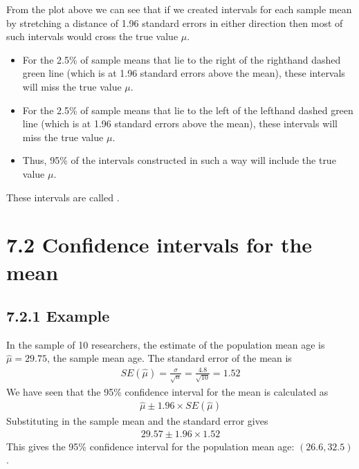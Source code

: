 \documentclass[letterpaper,10pt,english]{jupyterBook}
\begin{document}
\sphinxAtStartPar
From the plot above we can see that if we created intervals for each sample mean by stretching a distance of 1.96 standard errors in either direction then most of such intervals would cross the true value \(\mu\).
\begin{itemize}
\item {} 
\sphinxAtStartPar
For the 2.5\% of sample means that lie to the right of the right\sphinxhyphen{}hand dashed green line (which is at 1.96 standard errors above the mean), these intervals will miss the true value \(\mu\).

\item {} 
\sphinxAtStartPar
For the 2.5\% of sample means that lie to the left of the left\sphinxhyphen{}hand dashed green line (which is at 1.96 standard errors above the mean), these intervals will miss the true value \(\mu\).

\item {} 
\sphinxAtStartPar
Thus, 95\% of the intervals constructed in such a way will include the true value \(\mu\).

\end{itemize}

\sphinxAtStartPar
These intervals are called .


\section{7.2 Confidence intervals for the mean}
\label{\detokenize{07.c. Frequentist I:confidence-intervals-for-the-mean}}\label{\detokenize{07.c. Frequentist I::doc}}

\subsection{7.2.1 Example}
\label{\detokenize{07.c. Frequentist I:example}}
\sphinxAtStartPar
In the sample of 10 researchers, the estimate of the population mean age is \(\hat{\mu} = 29.75\), the sample mean age. The standard error of the mean is
\begin{equation*}
\begin{split}
SE(\hat{\mu}) = \frac{\sigma}{\sqrt{n}} = \frac{4.8}{\sqrt{10}} = 1.52
\end{split}
\end{equation*}
\sphinxAtStartPar
We have seen that the 95\% confidence interval for the mean is calculated as
\begin{equation*}
\begin{split}
\hat{\mu} \pm 1.96 \times SE(\hat{\mu})
\end{split}
\end{equation*}
\sphinxAtStartPar
Substituting in the sample mean and the standard error gives
\begin{equation*}
\begin{split}
29.57 \pm 1.96 \times 1.52 
\end{split}
\end{equation*}
\sphinxAtStartPar
This gives the 95\% confidence interval for the population mean age: \((26.6, 32.5)\).
\end{document}
